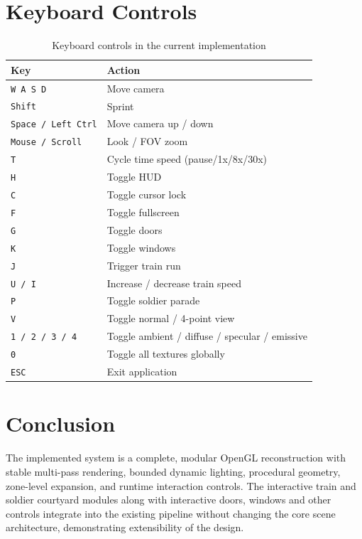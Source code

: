 \documentclass{article}
\begin{document}
\section{Keyboard Controls}
\begin{table}[H]
\centering
\small
\caption{Keyboard controls in the current implementation}
\begin{tabular}{|p{}|p{}|}
\hline
\textbf{Key} & \textbf{Action} \\
\hline
\texttt{W A S D} & Move camera \\
\hline
\texttt{Shift} & Sprint \\
\hline
\texttt{Space / Left Ctrl} & Move camera up / down \\
\hline
\texttt{Mouse / Scroll} & Look / FOV zoom \\
\hline
\texttt{T} & Cycle time speed (pause/1x/8x/30x) \\
\hline
\texttt{H} & Toggle HUD \\
\hline
\texttt{C} & Toggle cursor lock \\
\hline
\texttt{F} & Toggle fullscreen \\
\hline
\texttt{G} & Toggle doors \\
\hline
\texttt{K} & Toggle windows \\
\hline
\texttt{J} & Trigger train run \\
\hline
\texttt{U / I} & Increase / decrease train speed \\
\hline
\texttt{P} & Toggle soldier parade \\
\hline
\texttt{V} & Toggle normal / 4-point view \\
\hline
\texttt{1 / 2 / 3 / 4} & Toggle ambient / diffuse / specular / emissive \\
\hline
\texttt{0} & Toggle all textures globally \\
\hline
\texttt{ESC} & Exit application \\
\hline
\end{tabular}
\end{table}

\section{Conclusion}
The implemented system is a complete, modular OpenGL reconstruction with stable multi-pass rendering, bounded dynamic lighting, procedural geometry, zone-level expansion, and runtime interaction controls. The interactive train and soldier courtyard modules along with interactive doors, windows and other controls integrate into the existing pipeline without changing the core scene architecture, demonstrating extensibility of the design.
\end{document}
